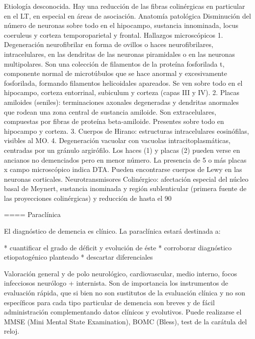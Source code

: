\documentclass[encares.tex]{subfiles}
\begin{document}
Etiología desconocida. Hay una reducción de las fibras colinérgicas en particular en el LT, en especial en áreas de asociación. Anatomía patológica Disminución del número de neuronas sobre todo en el hipocampo, sustancia innominada, locus coeruleus y corteza temporoparietal y frontal. Hallazgos microscópicos 1. Degeneración neurofibrilar en forma de ovillos o haces neurofibrilares, intracelulares, en las dendritas de las neuronas piramidales o en las neuronas multipolares. Son una colección de filamentos de la proteína fosforilada t, componente normal de microtúbulos que se hace anormal y excesivamente fosforilada, formando filamentos helicoidales apareados. Se ven sobre todo en el hipocampo, corteza entorrinal, subiculum y corteza (capas III y IV). 2. Placas amiloides (seniles): terminaciones axonales degeneradas y dendritas anormales que rodean una zona central de sustancia amiloide. Son extracelulares, compuestas por fibras de proteína beta-amiloide. Presentes sobre todo en hipocampo y corteza. 3. Cuerpos de Hirano: estructuras intracelulares eosinófilas, visibles al MO. 4. Degeneración vacuolar con vacuolas intracitoplasmáticas, centradas por un gránulo argirófilo. Los haces (1) y placas (2) pueden verse en ancianos no demenciados pero en menor número. La presencia de 5 o más placas x campo microscópico indica DTA. Pueden encontrarse cuerpos de Lewy en las neuronas corticales. Neurotransmisores Colinérgico: afectación especial del núcleo basal de Meynert, sustancia inominada y región sublenticular (primera fuente de las proyecciones colinérgicas) y reducción de hasta el 90%

==== Paraclínica

El diagnóstico de demencia es clínico. La paraclínica estará destinada a:

* cuantificar el grado de déficit y evolución de éste
* corroborar diagnóstico etiopatogénico planteado
* descartar diferenciales

Valoración general y de polo neurológico, cardiovascular, medio interno, focos infecciosos neurólogo + internista. Son de importancia los instrumentos de evaluación rápida, que si bien no son sustitutos de la evaluación clínica y no son específicos para cada tipo particular de demencia son breves y de fácil administración complementando datos clínicos y evolutivos. Puede realizarse el MMSE (Mini Mental State Examination), BOMC (Bless), test de la carátula del reloj.
\end{document}
